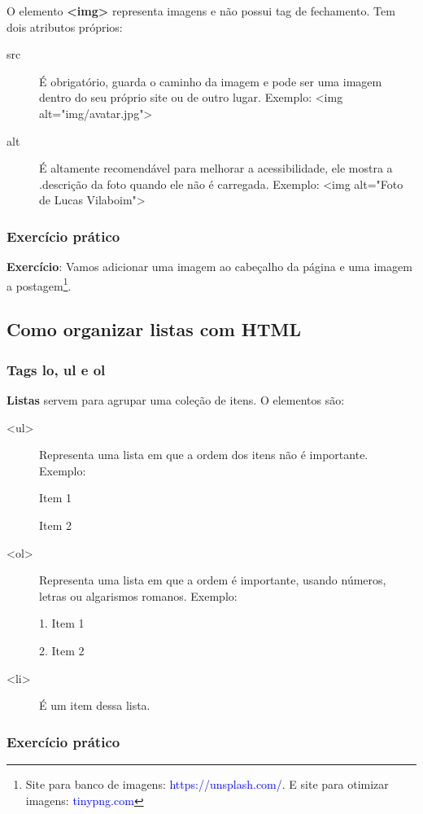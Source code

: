 \documentclass[12pt,a4paper]{article}
\begin{document}
	O elemento \textbf{<img>} representa imagens e não possui tag de fechamento. Tem dois atributos próprios:
	
	\begin{description}
		\item[src] É obrigatório, guarda o caminho da imagem e pode ser uma imagem dentro do seu próprio site ou de outro lugar. Exemplo: <img alt="img/avatar.jpg"> 
		\item[alt] É altamente recomendável para melhorar a acessibilidade, ele mostra a .descrição da foto quando ele não é carregada. Exemplo: <img alt="Foto de Lucas Vilaboim">
	\end{description}
	
	\subsubsection{Exercício prático}
	
	\textbf{Exercício}: Vamos adicionar uma imagem ao cabeçalho da página e uma imagem a postagem\footnote{Site para banco de imagens: \textcolor{blue}{https://unsplash.com/}. E site para otimizar imagens: \textcolor{blue}{tinypng.com}}.
	
	\subsection{Como organizar listas com HTML}
	\subsubsection{Tags lo, ul e ol}
	
	\textbf{Listas} servem para agrupar uma coleção de itens. O elementos são:
	\begin{description}
		\item[<ul>] Representa uma lista em que a ordem dos itens não é importante. Exemplo:
		
		Item 1
		
		Item 2
		\item[<ol>] Representa uma lista em que a ordem é importante, usando números, letras ou algarismos romanos. Exemplo:
		
		1. Item 1
		
		2. Item 2
		
		\item[<li>] É um item dessa lista.
	\end{description}
	
	\subsubsection{Exercício prático}
	
\end{document}
